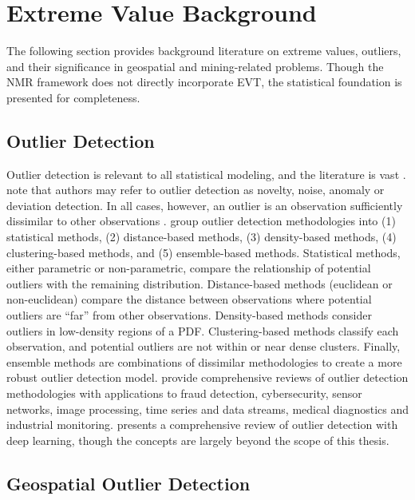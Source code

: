 \FloatBarrier
\section{Extreme Value Background}
\label{sec:01evtreview}

The following section provides background literature on extreme values, outliers, and their significance in geospatial and mining-related problems. Though the \gls{NMR} framework does not directly incorporate \gls{EVT}, the statistical foundation is presented for completeness.

\FloatBarrier
\subsection{Outlier Detection}
\label{subsec:01outlier}

Outlier detection is relevant to all statistical modeling, and the literature is vast \citep{zimek2018there}. \cite{hodge2004survey} note that authors may refer to outlier detection as novelty, noise, anomaly or deviation detection. In all cases, however, an outlier is an observation sufficiently dissimilar to other observations \citep{barnett1984outliers}. \cite{wang2019progress} group outlier detection methodologies into (1) statistical methods, (2) distance-based methods, (3) density-based methods, (4) clustering-based methods, and (5) ensemble-based methods. Statistical methods, either parametric or non-parametric, compare the relationship of potential outliers with the remaining distribution. Distance-based methods (euclidean or non-euclidean) compare the distance between observations where potential outliers are ``far'' from other observations. Density-based methods consider outliers in low-density regions of a \gls{PDF}. Clustering-based methods classify each observation, and potential outliers are not within or near dense clusters. Finally, ensemble methods are combinations of dissimilar methodologies to create a more robust outlier detection model. \cite{hodge2004survey,wang2019progress,pimentel2014review,boukerche2021outlier} provide comprehensive reviews of outlier detection methodologies with applications to fraud detection, cybersecurity, sensor networks, image processing, time series and data streams, medical diagnostics and industrial monitoring. \cite{pang2022deep} presents a comprehensive review of outlier detection with deep learning, though the concepts are largely beyond the scope of this thesis.

\FloatBarrier
\subsection{Geospatial Outlier Detection}
\label{subsec:01miningoutlier}

